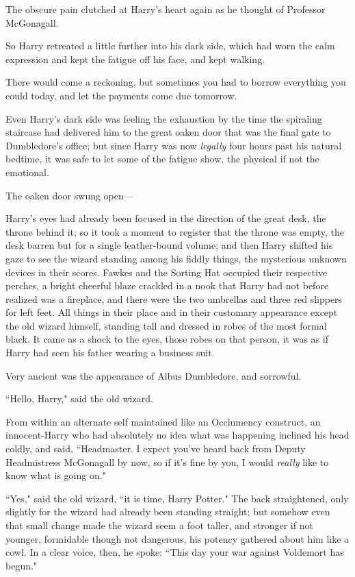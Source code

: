 The obscure pain clutched at Harry's heart again as he thought of Professor McGonagall.

So Harry retreated a little further into his dark side, which had worn the calm expression and kept the fatigue off his face, and kept walking.

There would come a reckoning, but sometimes you had to borrow everything you could today, and let the payments come due tomorrow.

\later

Even Harry's dark side was feeling the exhaustion by the time the spiraling staircase had delivered him to the great oaken door that was the final gate to Dumbledore's office; but since Harry was now \emph{legally} four hours past his natural bedtime, it was safe to let some of the fatigue show, the physical if not the emotional.

The oaken door swung open---

Harry's eyes had already been focused in the direction of the great desk, the throne behind it; so it took a moment to register that the throne was empty, the desk barren but for a single leather-bound volume; and then Harry shifted his gaze to see the wizard standing among his fiddly things, the mysterious unknown devices in their scores. Fawkes and the Sorting Hat occupied their respective perches, a bright cheerful blaze crackled in a nook that Harry had not before realized was a fireplace, and there were the two umbrellas and three red slippers for left feet. All things in their place and in their customary appearance except the old wizard himself, standing tall and dressed in robes of the most formal black. It came as a shock to the eyes, those robes on that person, it was as if Harry had seen his father wearing a business suit.

Very ancient was the appearance of Albus Dumbledore, and sorrowful.

``Hello, Harry," said the old wizard.

From within an alternate self maintained like an Occlumency construct, an innocent-Harry who had absolutely no idea what was happening inclined his head coldly, and said, ``Headmaster. I expect you've heard back from Deputy Headmistress McGonagall by now, so if it's fine by you, I would \emph{really} like to know what is going on."

``Yes," said the old wizard, ``it is time, Harry Potter." The back straightened, only slightly for the wizard had already been standing straight; but somehow even that small change made the wizard seem a foot taller, and stronger if not younger, formidable though not dangerous, his potency gathered about him like a cowl. In a clear voice, then, he spoke: ``This day your war against Voldemort has begun."

